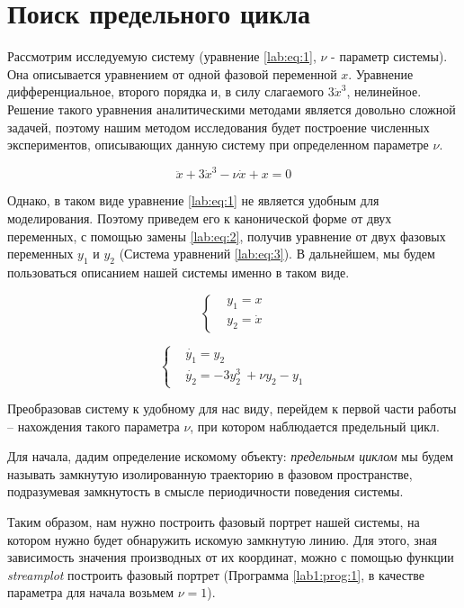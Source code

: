 \chapter{Поиск предельного цикла}

Рассмотрим исследуемую систему (уравнение \ref{lab:eq:1},
$\nu$ - параметр системы). Она описывается
уравнением от одной фазовой переменной $x$. Уравнение дифференциальное, второго
порядка и, в силу слагаемого $3\dot{x}^3$, нелинейное. Решение такого уравнения
аналитическими методами является довольно сложной задачей, поэтому нашим
методом исследования будет построение численных экспериментов, описывающих
данную систему при определенном параметре $\nu$.

\begin{equation}\label{lab:eq:1}
  \ddot{x} + 3 \dot{x}^3 - \nu\dot{x} + x = 0
\end{equation}

Однако, в таком виде уравнение \ref{lab:eq:1} не является удобным для
моделирования. Поэтому приведем его к канонической форме от двух переменных, с
помощью замены \ref{lab:eq:2}, получив уравнение от двух фазовых переменных
$y_1$ и $y_2$ (Система уравнений \ref{lab:eq:3}). В дальнейшем, мы будем
пользоваться описанием нашей системы именно в таком виде.

\begin{equation}\label{lab:eq:2}
  \begin{cases}
    &y_1 = x \\
    &y_2 = \dot{x}
  \end{cases}
\end{equation}

\begin{equation}\label{lab:eq:3}
  \begin{cases}
    &\dot{y_1} = y_2 \\
    &\dot{y_2} = -3y_2^3\ + \nu y_2 - y_1
  \end{cases}
\end{equation}

Преобразовав систему к удобному для нас виду, перейдем к первой части работы --
нахождения такого параметра $\nu$, при котором наблюдается предельный цикл.

Для начала, дадим определение искомому объекту: \textit{предельным циклом} мы
будем называть замкнутую изолированную траекторию в фазовом пространстве,
подразумевая замкнутость в смысле периодичности поведения системы.

Таким образом, нам нужно построить фазовый портрет нашей системы, на котором
нужно будет обнаружить искомую замкнутую линию. Для этого, зная зависимость
значения производных от их координат, можно с помощью функции
\textit{streamplot}\cite{streamplot} построить фазовый портрет (Программа
\ref{lab1:prog:1}, в качестве параметра для начала возьмем $\nu = 1$).

